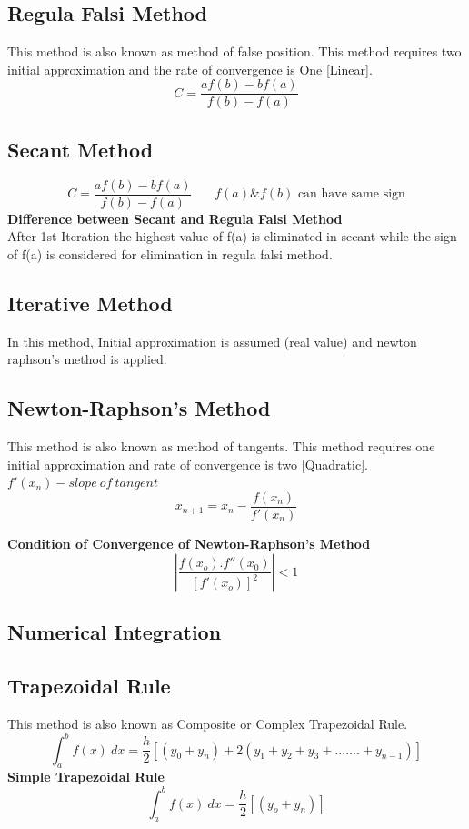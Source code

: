 \subsection*{Regula Falsi Method}
This method is also known as method of false position. This method requires two initial approximation and the rate of convergence is One [Linear].
\[C= \frac{af(b)-bf(a)}{f(b)-f(a)}\]

\subsection*{Secant Method}
\[C = \frac{af(b)-bf(a)}{f(b)-f(a)}\ \ \ \ \ \ \ \ f(a) \& f(b) \text{ can have same sign}\]
\textbf{Difference between Secant and Regula Falsi Method}\\
After 1st Iteration the highest value of f(a) is eliminated in secant while the sign of f(a) is considered for elimination in regula falsi method.

\subsection*{Iterative Method}
In this method, Initial approximation is assumed (real value) and newton raphson's method is applied.

\subsection*{Newton-Raphson's Method}
This method is also known as method of tangents. This method requires one initial approximation and rate of convergence is two [Quadratic]. \(f'(x_n)-slope\ of\ tangent\)
\[x_{n+1}=x_n-\frac{f(x_n)}{f'(x_n)}\]

\textbf{Condition of Convergence of Newton-Raphson's Method}
\[\left|\frac{f(x_o).f''(x_0)}{[f'(x_o)]^2} \right| < 1\]

\subsection{Numerical Integration}
\subsection*{Trapezoidal Rule}
This method is also known as Composite or Complex Trapezoidal Rule.\\
\[\int_a^bf(x)\ dx=\frac{h}{2}[(y_0+y_n)+2(y_1+y_2+y_3+\ldots\ldots.+y_{n-1})]\]
\textbf{Simple Trapezoidal Rule} \[\int_a^bf(x)\ dx=\frac{h}{2}[(y_o+y_n)]\]

